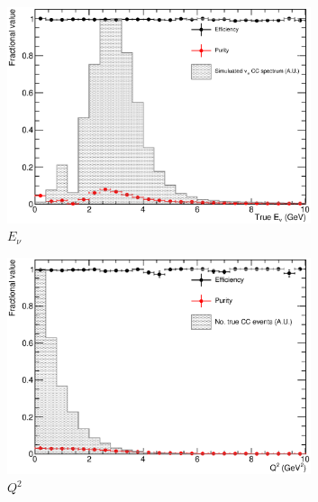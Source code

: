 \begin{figure}
  \centering
  \begin{subfigure}[t]{0.48\linewidth}
    \centering
    \includegraphics[width=0.98\textwidth]{ENuNoSelection.eps}
    \caption{$E_{\nu}$}
    \label{fig:ENuNoSelection}
  \end{subfigure}
  \hfill
  \begin{subfigure}[t]{0.48\linewidth}
    \centering
    \includegraphics[width=0.98\textwidth]{Q2NoSelection.eps}
    \caption{$Q^2$}
    \label{fig:Q2NoSelection}
  \end{subfigure}
  \vfill
  \begin{subfigure}[t]{0.48\linewidth}
    \centering

\end{subfigure}
\end{figure}
